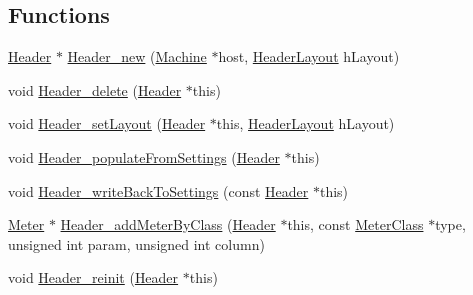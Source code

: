 \subsection*{Functions}
\begin{DoxyCompactItemize}
\item 
\hyperlink{linux_2download_2htop-3_83_80_2Header_8h_a7f4dfcf80c34406946a7bda3d88d5e36}{Header} $\ast$ \hyperlink{linux_2download_2htop-3_83_80_2Header_8h_a6b6de6db73a35db6cffc67f9e36dcdad}{Header\+\_\+new} (\hyperlink{Machine_8h_aa3706f95e4706b9d02979efcabb1341d}{Machine} $\ast$host, \hyperlink{HeaderLayout_8h_afc9cb7b84041249bac419260f679b6a9}{Header\+Layout} h\+Layout)
\item 
void \hyperlink{linux_2download_2htop-3_83_80_2Header_8h_aa6c5ee017dcbc2559b8043d13c6ce4ee}{Header\+\_\+delete} (\hyperlink{linux_2download_2htop-3_83_80_2Header_8h_a7f4dfcf80c34406946a7bda3d88d5e36}{Header} $\ast$this)
\item 
void \hyperlink{linux_2download_2htop-3_83_80_2Header_8h_a9918e7a64f023cbafbe9e52e7073c4f7}{Header\+\_\+set\+Layout} (\hyperlink{linux_2download_2htop-3_83_80_2Header_8h_a7f4dfcf80c34406946a7bda3d88d5e36}{Header} $\ast$this, \hyperlink{HeaderLayout_8h_afc9cb7b84041249bac419260f679b6a9}{Header\+Layout} h\+Layout)
\item 
void \hyperlink{linux_2download_2htop-3_83_80_2Header_8h_aa7bb04ad3231663bc2e520425c8eb97c}{Header\+\_\+populate\+From\+Settings} (\hyperlink{linux_2download_2htop-3_83_80_2Header_8h_a7f4dfcf80c34406946a7bda3d88d5e36}{Header} $\ast$this)
\item 
void \hyperlink{linux_2download_2htop-3_83_80_2Header_8h_ad8efc1073dcde3741fb1465237a7de8a}{Header\+\_\+write\+Back\+To\+Settings} (const \hyperlink{linux_2download_2htop-3_83_80_2Header_8h_a7f4dfcf80c34406946a7bda3d88d5e36}{Header} $\ast$this)
\item 
\hyperlink{Meter_8h_a36b2163502d1e0b7025c80f102390da2}{Meter} $\ast$ \hyperlink{linux_2download_2htop-3_83_80_2Header_8h_abef22ccfc18d4b931db18a618498d4cf}{Header\+\_\+add\+Meter\+By\+Class} (\hyperlink{linux_2download_2htop-3_83_80_2Header_8h_a7f4dfcf80c34406946a7bda3d88d5e36}{Header} $\ast$this, const \hyperlink{Meter_8h_a9113495eaa83bb6bcecf9632bcbe5cf3}{Meter\+Class} $\ast$type, unsigned int param, unsigned int column)
\item 
void \hyperlink{linux_2download_2htop-3_83_80_2Header_8h_a16dfc5a81555ed5b24fa76ca9dd382dd}{Header\+\_\+reinit} (\hyperlink{linux_2download_2htop-3_83_80_2Header_8h_a7f4dfcf80c34406946a7bda3d88d5e36}{Header} $\ast$this)

\end{DoxyCompactItemize}
